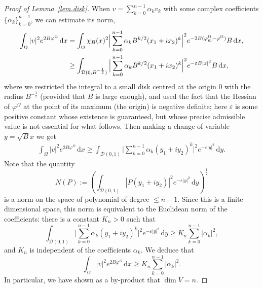 \documentclass[11pt,a4paper]{amsart}
\newcommand\Omg{\Omega}
\def\dd{{\,\mathrm{d}}}
\numberwithin{figure}{section}
\numberwithin{equation}{section}
\theoremstyle{plain}%
\theoremstyle{remark}
\theoremstyle{plain}
\newcommand\cD{\mathcal D}
\newcommand\cF{\mathcal F}
\def\cD{{\mathcal D}}   \def\cE{{\mathcal E}}   \def\cF{{\mathcal F}}
\begin{document}
\begin{proof}[Proof of Lemma~\ref{lem.disk}]
When $v = \sum_{k=0}^{n-1} \alpha_k v_k$ with some complex coefficients $\{\alpha_k\}_{k=0}^{n-1}$, we can estimate its norm,
\begin{align*}
\int_\Omg |v|^2 e^{2B \varphi^\Omg} \dd x &= 
\int_\Omg \chi_B(x)^2 \Big| \sum_{k=0}^{n-1} \alpha_k B^{k/2}(x_1+ix_2)^k \Big|^2 e^{-2B( \varphi^\Omg_{\rm m} - \varphi^\Omg)}B  \dd x, \\
& \geq \int_{\cD(0,B^{- \frac 12})} \Big| \sum_{k=0}^{n-1} \alpha_k B^{k/2}(x_1+ix_2)^k \Big|^2 e^{-\varepsilon B |x|^2}B \dd x,
\end{align*}
where we restricted the integral to a small disk centred at the origin  $0$ with the radius $B^{-\frac12}$ (provided that $B$ is large enough), and used the fact that the Hessian of $\varphi^\Omg$ at the point of its maximum (the origin) is negative definite; here $\varepsilon$ is some positive constant whose existence is guaranteed, but whose precise admissible value is not essential for what follows. Then making a change of variable $y = \sqrt{B} x$
we get
\begin{align*}
\int_\Omg |v|^2 e^{2B \varphi^\Omg} \dd x \geq \int_{\cD(0,1)} \Big|\sum_{k=0}^{n-1} \alpha_k (y_1+iy_2)^k \Big|^2 e^{-\varepsilon|y|^2} \dd y.
\end{align*}
Note that the quantity 
\[N(P):= \left( \int_{\cD(0,1)} | P(y_1 + i y_2) |^2 e^{-\varepsilon |y|^2} \dd y \right)^{\frac 12}\] is a norm on the space of polynomial of degree $\leq n-1$. Since this is a finite dimensional space, this norm is equivalent to the Euclidean norm of the coefficients: there is a constant $K_{n}>0$ such that
\[\int_{\cD(0,1)} \Big|\sum_{k=0}^{n-1} \alpha_k (y_1+iy_2)^k \Big|^2 e^{-\varepsilon |y|^2} \dd y \geq K_{n}  \sum_{k=0}^{n-1}|\alpha_k|^2,\]
and $K_{n}$ is independent of the coefficients $\alpha_k$. We deduce that
\begin{equation}\label{est.norm}
\int_\Omg |v|^2 e^{2B \varphi^\Omg} \dd x \geq K_n \sum_{k=0}^{n-1}|\alpha_k|^2.
\end{equation}
In particular, we have shown as a by-product that $\dim V = n$.


\end{proof}
\end{document}
